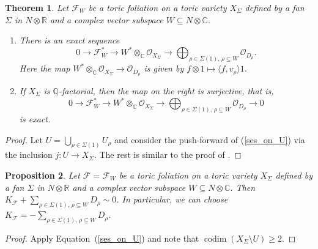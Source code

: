 \documentclass[12pt,reqno]{amsart}
\newtheorem{theorem}{Theorem}[section]
\newtheorem{proposition}[theorem]{Proposition}
\theoremstyle{definition}
\newcommand{\mc}{\mathcal}
\newcommand{\mb}{\mathbb}
\newcommand{\on}{\operatorname}
\newcommand\cF{{\mathcal{F}}}
\newcommand\bC{{\mathbb C}}
\newcommand\bR{{\mathbb R}}
\begin{document}
\begin{theorem}\label{first_ses}
    Let $\cF_W$ be a toric foliation on a toric variety $X_\Sigma$ defined by a fan $\Sigma$ in $N\otimes\bR$ and a complex vector subspace $W\subseteq N\otimes\bC$. 
    \begin{enumerate}
        \item There is an exact sequence
        \[
        0\rightarrow \mc F_W^*\rightarrow W^*\otimes_{\mb C}\mc O_{X_\Sigma}\rightarrow \bigoplus_{\rho\in\Sigma(1),\,\rho\subseteq W}\mc O_{D_\rho}.
        \]
        Here the map $W^*\otimes_{\mb C}\mc O_{X_\Sigma}\rightarrow \mc O_{D_\rho}$ is given by $f\otimes 1\mapsto\langle f,v_\rho\rangle 1$.
        \item If $X_\Sigma$ is $\mb Q$-factorial, then the map on the right is surjective, that is, 
        \[
        0\rightarrow \mc F_W^*\rightarrow W^*\otimes_{\mb C}\mc O_{X_\Sigma}\rightarrow \bigoplus_{\rho\in\Sigma(1),\,\rho\subseteq W}\mc O_{D_\rho}\rightarrow 0
        \]
        is exact.
    \end{enumerate}
\end{theorem}
\begin{proof}
    Let $U=\bigcup_{\rho\in\Sigma(1)}U_\rho$ and consider the push-forward of (\ref{ses_on_U}) via the inclusion $j\colon U\rightarrow X_\Sigma$. The rest is similar to the proof of \cite[Theorem 8.1.4]{CLS11}. 
\end{proof}

\begin{proposition}\label{can_divisor_prop}
Let $\cF=\cF_W$ be a toric foliation on a toric variety $X_\Sigma$ defined by a fan $\Sigma$ in $N\otimes\bR$ and a complex vector subspace $W\subseteq N\otimes\bC$. 
Then $K_\cF+\sum_{\rho\in\Sigma(1),\,\rho\subseteq W}D_\rho\sim 0$. 
In particular, we can choose $K_\cF=-\sum_{\rho\in\Sigma(1),\,\rho\subseteq W}D_\rho$. 
\end{proposition}
\begin{proof}
    Apply Equation~(\ref{ses_on_U}) and note that $\on{codim}(X_\Sigma\setminus U)\geq 2$.
\end{proof}
\end{document}
